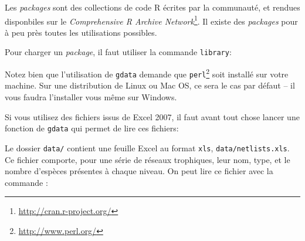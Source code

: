 \noindent Les \emph{packages} sont des collections de code R écrites par la communauté, et rendues disponbiles sur le \emph{Comprehensive R Archive Network}\footnote{\url{http://cran.r-project.org/}}.
Il existe des \emph{packages} pour à peu près toutes les utilisations possibles.

Pour charger un \emph{package}, il faut utiliser la commande \texttt{library}:

\begin{knitrout}
\color{fgcolor}\begin{kframe}
\begin{flushleft}
\ttfamily\noindent
{}\hlkeyword{(}\hlkeyword{)}\mbox{}
\normalfont
\end{flushleft}
\end{kframe}
\end{knitrout}


Notez bien que l'utilisation de \texttt{gdata} demande que \texttt{perl}\footnote{\url{http://www.perl.org/}} soit installé sur votre machine.
Sur une distribution de Linux ou Mac OS, ce sera le cas par défaut -- il vous faudra l'installer vous même sur Windows.

Si vous utilisez des fichiers issus de Excel 2007, il faut avant tout chose lancer une fonction de \texttt{gdata} qui permet de lire ces fichiers:

\begin{knitrout}
\color{fgcolor}\begin{kframe}
\begin{flushleft}
\ttfamily\noindent
{}\hlkeyword{(}\hlargument{=}{\ }\hlkeyword{,}{\ }\hlargument{=}{\ }\hlkeyword{)}\mbox{}
\normalfont
\end{flushleft}
\end{kframe}
\end{knitrout}


Le dossier \texttt{data/} contient une feuille Excel au format \texttt{xls}, \texttt{data/netlists.xls}. Ce fichier comporte, pour une série de réseaux trophiques, leur nom, type, et le nombre d'espèces présentes à chaque niveau.
On peut lire ce fichier avec la commande :

